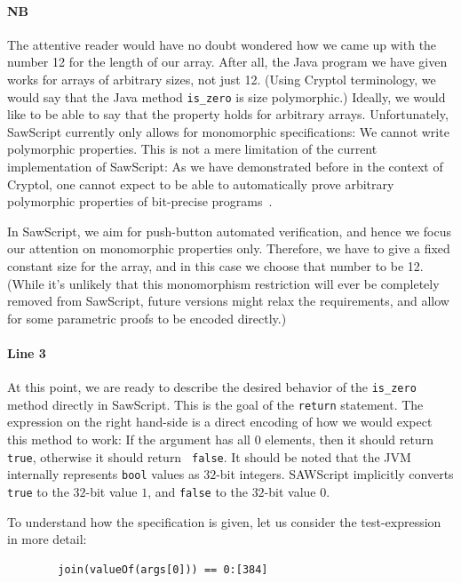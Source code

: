 \documentclass[12pt]{galois-whitepaper}
\newcommand{\sawScript}{{\sc SawScript}\xspace}
\begin{document}
\paragraph{NB} The attentive reader would have no doubt wondered how we came up with the number 12 for the length of our array. After
all, the Java program we have given works for arrays of arbitrary sizes, not just 12. (Using Cryptol terminology, we would say that
the Java method {\tt is\_zero} is size polymorphic.) Ideally, we would like to be able to say that the property holds for arbitrary
arrays. Unfortunately, \sawScript currently only allows for monomorphic specifications: We cannot write polymorphic properties. This
is not a mere limitation of the current implementation of \sawScript: As we have demonstrated before in the context of Cryptol, one cannot
expect to be able to automatically prove arbitrary polymorphic properties of bit-precise programs~\cite{erkok-matthews-cryptolEqChecking-09}.

In \sawScript, we
aim for push-button automated verification, and hence we focus our attention on monomorphic properties only. Therefore, we have to give
a fixed constant size for the array, and in this case we choose that number to be 12. (While it's unlikely that this monomorphism restriction
will ever be completely removed from \sawScript, future versions might relax the requirements, and allow for some parametric proofs to be encoded directly.)

\paragraph{Line 3} At this point, we are ready to describe the desired behavior
of the {\tt is\_zero} method directly in \sawScript. This is the goal of the
{\tt return} statement. The expression on the right hand-side is a direct
encoding of how we would expect this method to work: If the argument has all 0
elements, then it should return {\tt true}, otherwise it should return {\tt
false}.  It should be noted that the JVM internally represents {\tt bool}
values as $32$-bit integers.  SAWScript implicitly converts {\tt true} to the
$32$-bit value $1$, and {\tt false} to the $32$-bit value $0$.

To understand how the specification is given, let us consider the test-expression in more detail:

\begin{verbatim}
        join(valueOf(args[0])) == 0:[384]
\end{verbatim}
\end{document}
